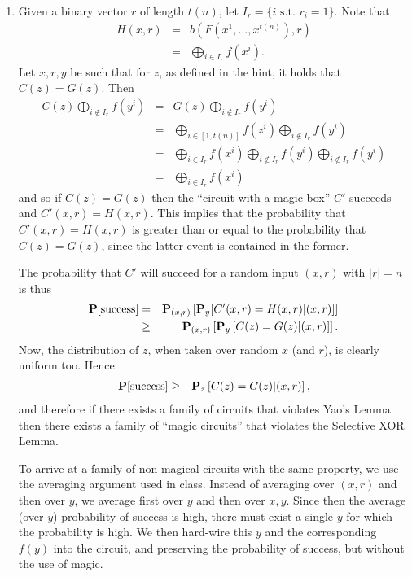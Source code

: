 \documentclass[11pt]{article} \usepackage{amssymb}
\begin{document}
\begin{enumerate}
\item
  Given a binary vector $r$ of length $t(n)$, let 
  $I_r=\{i\mbox{ s.t. } r_i=1\}$. Note that
  \begin{eqnarray*}
    H(x,r)&=& b\left(F\left(x^1,\ldots,x^{t(n)}\right),r\right)
    \\ &=& \bigoplus_{i\in I_r}f(x^i).
  \end{eqnarray*}
  Let $x,r,y$ be such that for $z$, as defined in the hint, it holds that
  $C(z)=G(z)$. Then 
  \begin{eqnarray*}
    C(z)\bigoplus_{i\not\in I_r}f(y^i) &=& G(z)\bigoplus_{i\not\in I_r}f(y^i)
    \\ &=& \bigoplus_{i\in[1,t(n)]}f(z^i)\bigoplus_{i\not\in I_r}f(y^i)
    \\ &=& \bigoplus_{i\in I_r}f(x^i)\bigoplus_{i\not\in I_r}f(y^i)\bigoplus_{i\not\in I_r}f(y^i)
    \\ &=& \bigoplus_{i\in I_r}f(x^i)
  \end{eqnarray*}
  and so if $C(z)=G(z)$ then the ``circuit
  with a magic box'' $C'$ succeeds and $C'(x,r)=H(x,r)$. 
  This implies that the probability
  that $C'(x,r)= H(x,r)$ is greater than or equal to the probability that
  $C(z)= G(z)$, since the latter event is contained in the former.
  
  The probability that  $C'$ will succeed for a random input $(x,r)$ with
  $|r|=n$ is thus
  \begin{eqnarray*}
    \P[\mbox{success}] &=& \P_{(x,r)}\left[\P_y[C'(x,r)= H(x,r)|(x,r)]\right]
    \\ &\geq& \P_{(x,r)}\left[\P_y\left[C(z)= G(z)|(x,r)\right]\right].
  \end{eqnarray*}
  Now, the distribution of $z$, when taken over random $x$ (and $r$), is clearly
  uniform too. Hence
  \begin{eqnarray*}
    \P[\mbox{success}] &\geq & \P_z\left[C(z)= G(z)|(x,r)\right],
  \end{eqnarray*}
  and therefore if there exists a family of circuits that violates Yao's 
  Lemma then there exists a family of ``magic circuits'' that violates the 
  Selective XOR Lemma.

  To arrive at a family of non-magical circuits with the same property, we
  use the averaging argument used in class. Instead of averaging over $(x,r)$
  and then over $y$, we average first over $y$ and then over $x,y$. Since
  then the average (over $y$) probability of success is high, there must exist 
  a single $y$ for which the probability is high. We then hard-wire this
  $y$ and the corresponding $f(y)$ into the circuit, and preserving the
  probability of success, but without the use of magic.
\end{enumerate}
\end{document}
